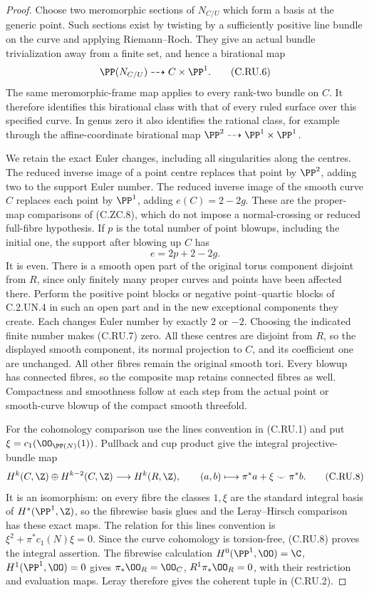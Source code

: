 \begin{proof}
Choose two meromorphic sections of $N_{C/U}$ which form a basis at the
generic point. Such sections exist by twisting by a sufficiently positive
line bundle on the curve and applying Riemann--Roch. They give an actual
bundle trivialization away from a finite set, and hence a birational map
\[
                         \PP(N_{C/U})\dashrightarrow C\times\PP^1.
\tag{C.RU.6}
\]
The same meromorphic-frame map applies to every rank-two bundle on $C$.
It therefore identifies this birational class with that of every ruled
surface over this specified curve. In genus zero it also identifies the
rational class, for example through the affine-coordinate birational map
$\PP^2\dashrightarrow\PP^1\times\PP^1$.

We retain the exact Euler changes, including all singularities along the
centres. The reduced inverse image of a point centre replaces that point
by $\PP^2$, adding two to the support Euler number. The reduced inverse
image of the smooth curve $C$ replaces each point by $\PP^1$, adding
$e(C)=2-2g$. These are the proper-map comparisons of (C.ZC.8), which do
not impose a normal-crossing or reduced full-fibre hypothesis. If $p$ is
the total number of point blowups, including the initial one, the support
after blowing up $C$ has
\[
                              e=2p+2-2g.
\tag{C.RU.7}
\]
It is even. There is a smooth open part of the original torus component
disjoint from $R$, since only finitely many proper curves and points have
been affected there. Perform the positive point blocks or negative
point--quartic blocks of C.2.UN.4 in such an open part and in the new
exceptional components they create. Each changes Euler number by exactly
$2$ or $-2$. Choosing the indicated finite number makes (C.RU.7) zero.
All these centres are disjoint from $R$, so the displayed smooth component,
its normal projection to $C$, and its coefficient one are unchanged.
All other fibres remain the original smooth tori. Every blowup has
connected fibres, so the composite map retains connected fibres as well.
Compactness and smoothness follow at each step from the actual point or
smooth-curve blowup of the compact smooth threefold.

For the cohomology comparison use the lines convention in (C.RU.1) and
put $\xi=c_1(\OO_{\PP(N)}(1))$. Pullback and cup product give the integral
projective-bundle map
\[
 H^k(C,\Z)\oplus H^{k-2}(C,\Z)
       \longrightarrow H^k(R,\Z),\qquad
 (a,b)\longmapsto\pi^*a+\xi\smile\pi^*b.
\tag{C.RU.8}
\]
It is an isomorphism: on every fibre the classes $1,\xi$ are the standard
integral basis of $H^*(\PP^1,\Z)$, so the fibrewise basis glues and the
Leray--Hirsch comparison has these exact maps. The relation for this lines
convention is $\xi^2+\pi^*c_1(N)\xi=0$. Since the curve cohomology is
torsion-free, (C.RU.8) proves the integral assertion. The fibrewise
calculation $H^0(\PP^1,\OO)=\C$, $H^1(\PP^1,\OO)=0$ gives
$\pi_*\OO_R=\OO_C$, $R^1\pi_*\OO_R=0$, with their restriction and
evaluation maps. Leray therefore gives the coherent tuple in (C.RU.2).


\end{proof}
